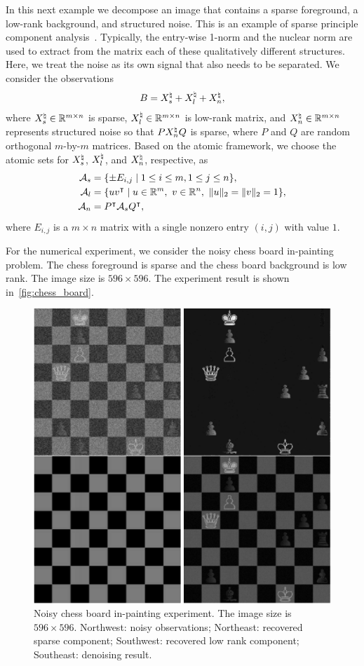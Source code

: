 In this next example we decompose an image that contains a sparse foreground, a low-rank background, and structured noise. This is an example of sparse principle component analysis~\cite{fazel1998approximations,fhb01,pati1994phase,valiant1977graph}. Typically, the entry-wise 1-norm and the nuclear norm are used to extract from the matrix each of these qualitatively different structures. Here, we treat the noise as its own signal that also needs to be separated. We consider the observations
\[B = X^{\natural}_s + X^{\natural}_l + X^{\natural}_n,\]
where $X^{\natural}_s\in\mathbb{R}^{m\times n}$ is sparse, $X^{\natural}_l\in\mathbb{R}^{m\times n}$ is low-rank matrix, and $X^{\natural}_n\in\mathbb{R}^{m\times n}$ represents structured noise so that $PX^{\natural}_nQ$ is sparse, where $P$ and $Q$ are random orthogonal $m$-by-$m$ matrices. Based on the atomic framework, we choose the atomic sets for $X^{\natural}_s$, $X^{\natural}_l$, and $X^{\natural}_n$, respective, as
\begin{align*}
    \Ascr_s &= \{\pm E_{i,j} \mid 1 \leq i \leq m, 1 \leq j \leq n \},
  \\\Ascr_l &= \{uv^\intercal \mid u \in \Re^m,\ v \in \Re^n,\ \|u\|_2=\|v\|_2 = 1\},
  \\\Ascr_n &= P^\intercal\Ascr_s Q^\intercal,
\end{align*}
where $E_{i,j}$ is a $m\times n$ matrix with a single nonzero entry $(i,j)$ with value $1$. 

For the numerical experiment, we consider the noisy chess board in-painting problem. The chess foreground is sparse and the chess board background is low rank. The image size is $596\times596$. The experiment result is shown in~\autoref{fig:chess_board}. 

\begin{figure}[t]
    \centering
    \includegraphics[width=.6\textwidth]{./figures/ChessBoard.pdf}
    \caption{Noisy chess board in-painting experiment. The image size is $596\times596$. Northwest: noisy observations; Northeast: recovered sparse component; Southwest: recovered low rank component; Southeast: denoising result.}
    \label{fig:chess_board}
\end{figure}

